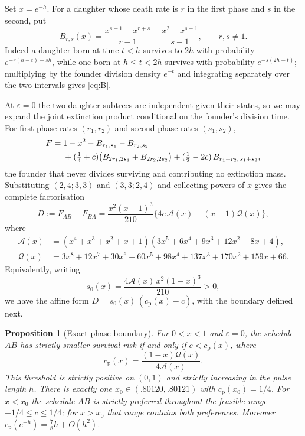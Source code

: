 \documentclass[11pt]{article}
\theoremstyle{plain}
\newtheorem{proposition}[theorem]{Proposition}
\theoremstyle{definition}
\theoremstyle{remark}
\newcommand{\eps}{\varepsilon}
\newcommand{\cp}{c_{\mathrm p}}
\begin{document}
Set $x=e^{-h}$. For a daughter whose death rate is $r$ in the first phase and
$s$ in the second, put
\begin{equation}\label{eq:B}
 B_{r,s}(x)=\frac{x^{s+1}-x^{r+s}}{r-1}+\frac{x^{2}-x^{s+1}}{s-1},
 \qquad r,s\ne1 .
\end{equation}
Indeed a daughter born at time $t<h$ survives to $2h$ with probability
$e^{-r(h-t)-sh}$, while one born at $h\le t<2h$ survives with probability
$e^{-s(2h-t)}$; multiplying by the founder division density $e^{-t}$ and
integrating separately over the two intervals gives \eqref{eq:B}.

At $\eps=0$ the two daughter subtrees are independent given their states, so we
may expand the joint extinction product conditional on the founder's division
time. For first-phase rates $(r_1,r_2)$ and second-phase rates $(s_1,s_2)$,
\begin{align}\label{eq:two-phase}
 F={}&1-x^2-B_{r_1,s_1}-B_{r_2,s_2}\notag\\
 &+(\tfrac14+c)\bigl(B_{2r_1,2s_1}+B_{2r_2,2s_2}\bigr)
 +(\tfrac12-2c)\,B_{r_1+r_2,\,s_1+s_2} ,
\end{align}
the founder that never divides surviving and contributing no extinction mass.
Substituting $(2,4;3,3)$ and $(3,3;2,4)$ and collecting powers of $x$ gives the
complete factorisation
\begin{equation}\label{eq:D}
 D:=F_{AB}-F_{BA}=\frac{x^{2}(x-1)^{3}}{210}\bigl\{4c\,\mathcal A(x)+(x-1)\mathcal Q(x)\bigr\},
\end{equation}
where
\begin{align*}
 \mathcal A(x)&=(x^4+x^3+x^2+x+1)(3x^5+6x^4+9x^3+12x^2+8x+4),\\
 \mathcal Q(x)&=3x^8+12x^7+30x^6+60x^5+98x^4+137x^3+170x^2+159x+66 .
\end{align*}
Equivalently, writing
\begin{equation}\label{eq:slope}
 s_0(x)=\frac{4\mathcal A(x)\,x^2(1-x)^3}{210}>0,
\end{equation}
we have the affine form $D=s_0(x)\,(\cp(x)-c)$, with the boundary defined next.

\begin{proposition}[Exact phase boundary]\label{prop:boundary}
For $0<x<1$ and $\eps=0$, the schedule $AB$ has strictly smaller survival risk
if and only if $c<\cp(x)$, where
\begin{equation}\label{eq:cp}
 \cp(x)=\frac{(1-x)\mathcal Q(x)}{4\mathcal A(x)} .
\end{equation}
This threshold is strictly positive on $(0,1)$ and strictly increasing in the
pulse length $h$. There is exactly one $x_0\in(.80120,.80121)$ with
$\cp(x_0)=1/4$. For $x<x_0$ the schedule $AB$ is strictly preferred throughout
the feasible range $-1/4\le c\le1/4$; for $x>x_0$ that range contains both
preferences. Moreover $\cp(e^{-h})=\tfrac78h+O(h^2)$.
\end{proposition}
\end{document}
